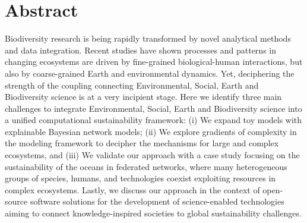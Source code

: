 \documentclass[12pt,a4paper]{article}
\begin{document}
\section{Abstract}
Biodiversity research is being rapidly transformed by novel analytical methods and data integration. Recent studies have shown processes and patterns in changing ecosystems are driven by fine-grained biological-human interactions, but also by coarse-grained Earth and environmental dynamics. Yet, deciphering the strength of the coupling connecting Environmental, Social, Earth and Biodiversity science is at a very incipient stage. Here we identify three main challenges to integrate Environmental, Social, Earth and Biodiversity science into a unified computational sustainability framework: (i) We expand toy models with explainable Bayesian network models; (ii) We explore gradients of complexity in the modeling framework to decipher the mechanisms for large and complex ecosystems, and (iii) We validate our approach with a case study focusing on the sustainability of the oceans in federated networks, where many heterogeneous groups of species, humans, and technologies coexist exploiting resources in complex ecosystems. Lastly, we discuss our approach in the context of open-source software solutions for the development of science-enabled technologies aiming to connect knowledge-inspired societies to global sustainability challenges.

\end{document}
